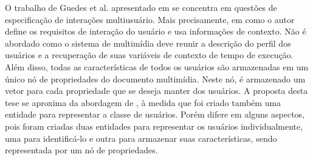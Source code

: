 O trabalho de Guedes et al. apresentado em \cite{guedes2017extending} se concentra em questões de especificação de interações multiusuário. Mais precisamente, em como o autor define os requisitos de interação do usuário e usa informações de contexto. Não é abordado como o sistema de multimídia deve reunir a descrição do perfil dos usuários e a recuperação de suas variáveis de contexto de tempo de execução. Além disso, todas as características de todos os usuários são armazenadas em um único nó de propriedades do documento multimídia. Neste nó, é armazenado um vetor para cada propriedade que se deseja manter dos usuários. A proposta desta tese se aproxima da abordagem de \cite{guedes2017extending}, à medida que foi criado também uma entidade para representar a classe de usuários. Porém difere em alguns aspectos, pois foram criadas duas entidades para representar os usuários individualmente, uma para identificá-lo e outra para armazenar suas características, sendo representada por um nó de propriedades.



